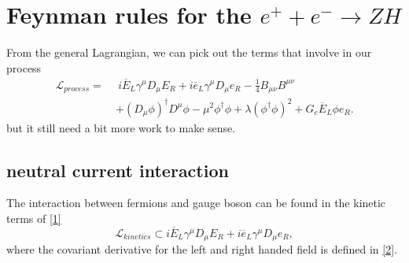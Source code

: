 \documentclass{report}
\numberwithin{equation}{section}
\begin{document}
\section{Feynman rules for the $e^+ + e^- \rightarrow Z H$}
From the general Lagrangian, we can pick out the terms that involve in our process
\begin{equation}
\begin{split}
\mathcal{L}_{process}=\ &\ i\overline{E}_L\gamma^\mu D_\mu E_R + i\overline{e}_L\gamma^\mu D_\mu e_R
-\frac{1}{4}B_{\mu\nu}B^{\mu\nu}\\
&+(D_\mu\phi)^\dagger D^\mu \phi -\mu^2 \phi^\dagger \phi + \lambda(\phi^\dagger \phi)^2+G_e\overline{E}_L\phi e_R.
\end{split}\label{1}
\end{equation}
but it still need a bit more work to make sense.
\subsection{neutral current interaction}

The interaction between fermions and gauge boson can be found in the kinetic terms of \eqref{1}
\begin{equation}
\mathcal{L}_{kinetics}\subset i\overline{E}_L\gamma^\mu D_\mu E_R + i\overline{e}_L\gamma^\mu D_\mu e_R \label{5},
\end{equation}
where the covariant derivative for the left and right handed field is defined in \eqref{2}. 
\end{document}
